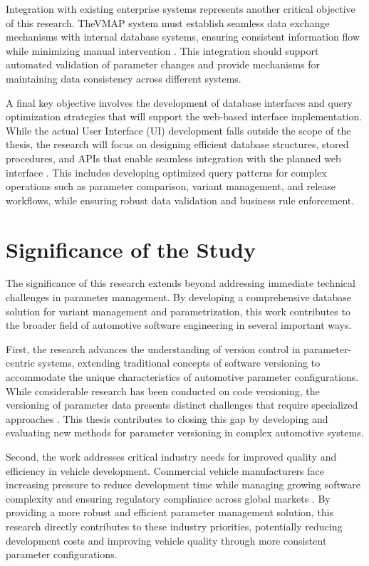 Integration with existing enterprise systems represents another critical objective of this research. The\ac{VMAP} system must establish seamless data exchange mechanisms with internal database systems, ensuring consistent information flow while minimizing manual intervention \cite{broy2006challenges}. This integration should support automated validation of parameter changes and provide mechanisms for maintaining data consistency across different systems.

A final key objective involves the development of database interfaces and query optimization strategies that will support the web-based interface implementation. While the actual User Interface (UI) development falls outside the scope of the thesis, the research will focus on designing efficient database structures, stored procedures, and APIs that enable seamless integration with the planned web interface \cite{pretschner2007software}. This includes developing optimized query patterns for complex operations such as parameter comparison, variant management, and release workflows, while ensuring robust data validation and business rule enforcement.

\section{Significance of the Study}
\label{sec:significance}

The significance of this research extends beyond addressing immediate technical challenges in parameter management. By developing a comprehensive database solution for variant management and parametrization, this work contributes to the broader field of automotive software engineering in several important ways.

First, the research advances the understanding of version control in parameter-centric systems, extending traditional concepts of software versioning to accommodate the unique characteristics of automotive parameter configurations. While considerable research has been conducted on code versioning, the versioning of parameter data presents distinct challenges that require specialized approaches \cite{bhattacherjee2015principles}. This thesis contributes to closing this gap by developing and evaluating new methods for parameter versioning in complex automotive systems.

Second, the work addresses critical industry needs for improved quality and efficiency in vehicle development. Commercial vehicle manufacturers face increasing pressure to reduce development time while managing growing software complexity and ensuring regulatory compliance across global markets \cite{broy2006challenges}. By providing a more robust and efficient parameter management solution, this research directly contributes to these industry priorities, potentially reducing development costs and improving vehicle quality through more consistent parameter configurations.

